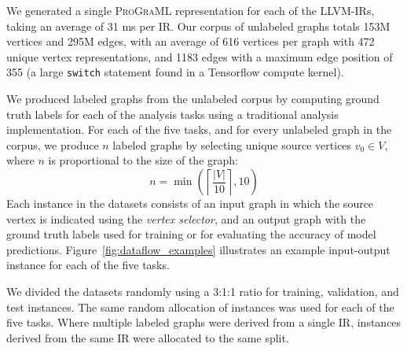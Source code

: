 We generated a single \textsc{ProGraML} representation for each of the
LLVM-IRs, taking an average of 31 ms per IR. Our corpus of unlabeled
graphs totals 153M vertices and 295M edges, with an average of 616
vertices per graph with 472 unique vertex representations, and 1183
edges with a maximum edge position of 355 (a large \texttt{switch}
statement found in a Tensorflow compute kernel).

We produced labeled graphs from the unlabeled corpus by computing
ground truth labels for each of the analysis tasks using a traditional
analysis implementation.  For each of the five tasks, and for every
unlabeled graph in the corpus, we produce $n$ labeled graphs by
selecting unique source vertices $v_{0} \in V$, where $n$ is
proportional to the size of the graph:
\begin{equation}
n = \min \left( \left\lceil \frac{|V|}{10} \right\rceil, 10 \right)
\end{equation}
Each instance in the datasets consists of an input graph in which the
source vertex is indicated using the \emph{vertex selector}, and an
output graph with the ground truth labels used for training or for
evaluating the accuracy of model
predictions. Figure~\ref{fig:dataflow_examples} illustrates an example
input-output instance for each of the five tasks.

We divided the datasets randomly using a 3:1:1 ratio for training,
validation, and test instances. The same random allocation of
instances was used for each of the five tasks. Where multiple labeled
graphs were derived from a single IR, instances derived from the same
IR were allocated to the same split.

